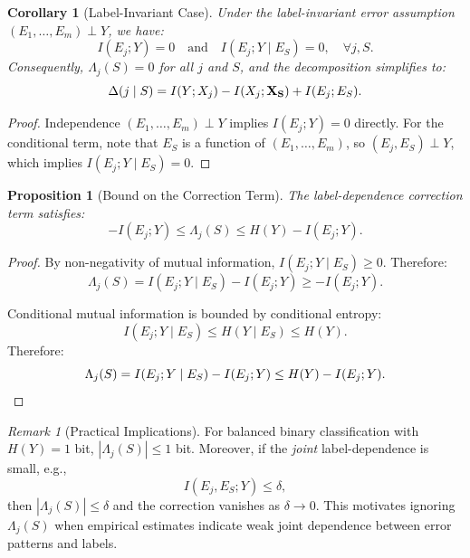 \documentclass{article}
\theoremstyle{plain}
\newtheorem{proposition}[theorem]{Proposition}
\newtheorem{corollary}[theorem]{Corollary}
\theoremstyle{definition}
\theoremstyle{remark}
\newtheorem{remark}[theorem]{Remark}
\begin{document}
\begin{corollary}[Label-Invariant Case]
\label{cor:label_invariant}
Under the label-invariant error assumption $(E_1, \ldots, E_m) \perp Y$, we have:
\begin{equation}
    I(E_j; Y) = 0 \quad \text{and} \quad I(E_j; Y \mid E_S) = 0, \quad \forall j, S.
\end{equation}
Consequently, $\Lambda_j(S) = 0$ for all $j$ and $S$, and the decomposition simplifies to:
\begin{equation}
    \Delta(j \mid S) = I(Y; X_j) - I(X_j; {\bf X_S}) + I(E_j; E_S).
\end{equation}
\end{corollary}

\begin{proof}
Independence $(E_1, \ldots, E_m) \perp Y$ implies $I(E_j; Y) = 0$ directly. For the conditional term, note that $E_S$ is a function of $(E_1, \ldots, E_m)$, so $(E_j, E_S) \perp Y$, which implies $I(E_j; Y \mid E_S) = 0$.
\end{proof}

\begin{proposition}[Bound on the Correction Term]
\label{prop:correction_bound_restate}
The label-dependence correction term satisfies:
\begin{equation}
    -I(E_j; Y) \leq \Lambda_j(S) \leq H(Y) - I(E_j; Y).
\end{equation}
\end{proposition}

\begin{proof}
By non-negativity of mutual information, $I(E_j; Y \mid E_S) \geq 0$. Therefore:
\begin{equation}
    \Lambda_j(S) = I(E_j; Y \mid E_S) - I(E_j; Y) \geq -I(E_j; Y).
\end{equation}


Conditional mutual information is bounded by conditional entropy:
\begin{equation}
    I(E_j; Y \mid E_S) \leq H(Y \mid E_S) \leq H(Y).
\end{equation}
Therefore:
\begin{equation}
    \Lambda_j(S) = I(E_j; Y \mid E_S) - I(E_j; Y) \leq H(Y) - I(E_j; Y). \qedhere
\end{equation}
\end{proof}

\begin{remark}[Practical Implications]
\label{rem:practical}
For balanced binary classification with $H(Y)=1$ bit, $|\Lambda_j(S)|\le 1$ bit.
Moreover, if the \emph{joint} label-dependence is small, e.g.,
\begin{equation}
    I(E_j,E_S;Y)\le \delta,
\end{equation}
then $|\Lambda_j(S)|\le \delta$ and the correction vanishes as $\delta\to 0$.
This motivates ignoring $\Lambda_j(S)$ when empirical estimates indicate weak joint
dependence between error patterns and labels.
\end{remark}
\end{document}

